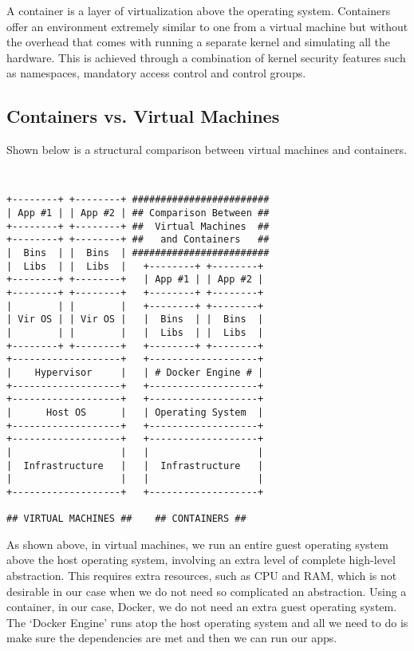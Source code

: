 \documentclass[letterpaper,twocolumn,10pt]{article}
\begin{document}
A container is a layer of virtualization above the operating system. Containers offer an environment extremely similar to one from a virtual machine but without the overhead that comes with running a separate kernel and simulating all the hardware. This is achieved through a combination of kernel security features such as namespaces, mandatory access control and control groups.

\subsection{Containers vs. Virtual Machines}

Shown below is a structural comparison between virtual machines and containers.

{\tt \small
\begin{verbatim}
+--------+ +--------+ ########################
| App #1 | | App #2 | ## Comparison Between ##
+--------+ +--------+ ##  Virtual Machines  ##
+--------+ +--------+ ##   and Containers   ##
|  Bins  | |  Bins  | ########################
|  Libs  | |  Libs  |   +--------+ +--------+
+--------+ +--------+   | App #1 | | App #2 |
+--------+ +--------+   +--------+ +--------+
|        | |        |   +--------+ +--------+
| Vir OS | | Vir OS |   |  Bins  | |  Bins  |
|        | |        |   |  Libs  | |  Libs  |
+--------+ +--------+   +--------+ +--------+
+-------------------+   +-------------------+
|    Hypervisor     |   | # Docker Engine # |
+-------------------+   +-------------------+
+-------------------+   +-------------------+
|      Host OS      |   | Operating System  |
+-------------------+   +-------------------+
+-------------------+   +-------------------+
|                   |   |                   |
|  Infrastructure   |   |  Infrastructure   |
|                   |   |                   |
+-------------------+   +-------------------+
 
## VIRTUAL MACHINES ##    ## CONTAINERS ##
\end{verbatim}
}

\noindent
As shown above, in virtual machines, we run an entire guest operating system above the host operating system, involving an extra level of complete high-level abstraction. This requires extra resources, such as CPU and RAM, which is not desirable in our case when we do not need so complicated an abstraction. Using a container, in our case, Docker, we do not need an extra guest operating system. The `Docker Engine' runs atop the host operating system and all we need to do is make sure the dependencies are met and then we can run our apps.
\end{document}
